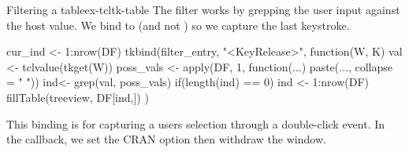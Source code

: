 \begin{example}{Filtering a table}{ex-tcltk-table}
The filter works by grepping the user input against the host value. We
bind to  (and not ) so we capture the last keystroke.
\begin{Schunk}
\begin{Sinput}
 cur_ind <- 1:nrow(DF)
 tkbind(filter_entry, "<KeyRelease>", function(W, K) {
   val <- tclvalue(tkget(W))
   poss_vals <- apply(DF, 1, function(...) 
                     paste(..., collapse = " "))
   ind<- grep(val, poss_vals)
   if(length(ind) == 0) ind <- 1:nrow(DF)
   fillTable(treeview, DF[ind,])
 })
\end{Sinput}
\end{Schunk}
%
This binding is for capturing a users selection through a double-click
event. In the callback, we set the CRAN option then withdraw the window.
\begin{Schunk}
\end{Schunk}
\end{example}

